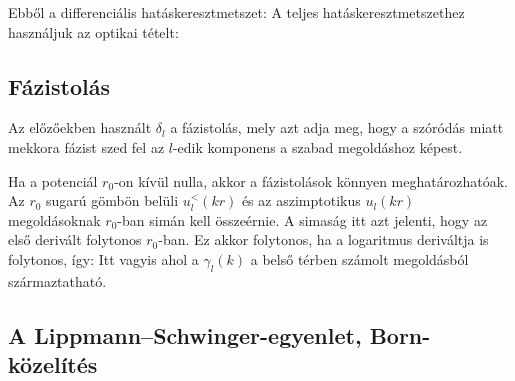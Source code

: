    Ebből a differenciális hatáskeresztmetszet:
   A teljes hatáskeresztmetszethez használjuk az optikai tételt:
   
  \subsection{Fázistolás}
   
   Az előzőekben használt $\delta_l$ a fázistolás, mely azt adja meg, hogy a szóródás miatt mekkora fázist szed fel az $l$-edik komponens a szabad megoldáshoz képest. 
   
   Ha a potenciál $r_0$-on kívül nulla, akkor a fázistolások könnyen meghatározhatóak.  Az $r_0$ sugarú gömbön belüli $u_l^{<}(kr)$ és az aszimptotikus $u_l(kr)$ megoldásoknak $r_0$-ban simán kell összeérnie.
   A simaság itt azt jelenti, hogy az első derivált folytonos $r_0$-ban.
   Ez akkor folytonos, ha a logaritmus deriváltja is folytonos, így:
   Itt
   vagyis 
   ahol a $\gamma_l(k)$ a belső térben számolt megoldásból származtatható.
   
  \subsection{A Lippmann--Schwinger-egyenlet, Born-közelítés}
   
